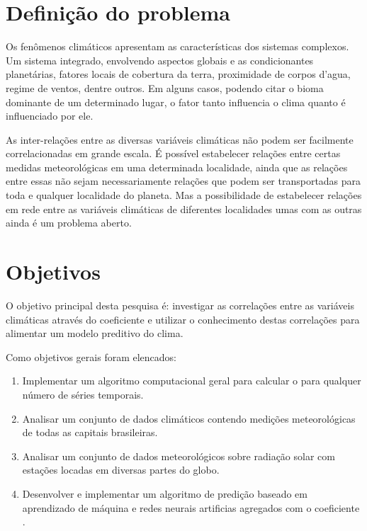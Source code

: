 \section{Definição do problema}
\label{sec:problema}

Os fenômenos climáticos apresentam as características dos sistemas complexos. Um sistema integrado, envolvendo aspectos globais e as condicionantes planetárias, fatores locais de cobertura da terra, proximidade de corpos d'agua, regime de ventos, dentre outros. Em alguns casos, podendo citar o bioma dominante de um determinado lugar, o fator tanto influencia o clima quanto é influenciado por ele.

As inter-relações entre as diversas variáveis climáticas não podem ser facilmente correlacionadas em grande escala. É possível estabelecer relações entre certas medidas meteorológicas em uma determinada localidade, ainda que as relações entre essas não sejam necessariamente relações que podem ser transportadas para toda e qualquer localidade do planeta. Mas a possibilidade de estabelecer relações em rede entre as variáveis climáticas de diferentes localidades umas com as outras ainda é um problema aberto.

\section{Objetivos}
\label{sec:Objetivos}

O objetivo principal desta pesquisa é: investigar as correlações entre as variáveis climáticas através do coeficiente \dmc e utilizar o conhecimento destas correlações para alimentar um modelo preditivo do clima.

Como objetivos gerais foram elencados:

\begin{enumerate}
    \label{enum:obj_espec}
    \item Implementar um algoritmo computacional geral para calcular o \dmc para qualquer número de séries temporais.
    \item Analisar um conjunto de dados climáticos contendo medições meteorológicas de todas as capitais brasileiras.
    \item Analisar um conjunto de dados meteorológicos sobre radiação solar com estações locadas em diversas partes do globo.
    \item Desenvolver e implementar um algoritmo de predição baseado em aprendizado de máquina e redes neurais artificias agregados com o coeficiente \dmc.
\end{enumerate}

